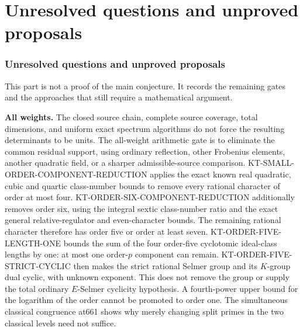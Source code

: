 \documentclass[11pt,a4paper]{article}
\theoremstyle{definition}
\renewcommand{\paragraph}[1]{\par\smallskip\noindent\textbf{#1}\quad\ignorespaces}
\begin{document}

\part{Unresolved questions and unproved proposals}

\section{Unresolved questions and unproved proposals}

This part is not a proof of the main conjecture. It records the
remaining gates and the approaches that still require a
mathematical argument.

\paragraph{All weights.}
The closed source chain, complete source coverage, total
dimensions, and uniform exact spectrum algorithms do not
force the resulting determinants to be units. The all-weight
arithmetic gate is to eliminate the common residual support,
using ordinary reflection, other Frobenius elements, another
quadratic field, or a sharper admissible-source comparison.
KT-SMALL-ORDER-COMPONENT-REDUCTION applies the exact known
real quadratic, cubic and quartic class-number bounds to
remove every rational character of order at most four.
KT-ORDER-SIX-COMPONENT-REDUCTION additionally removes order six,
using the integral sextic class-number ratio and the exact general
relative-regulator and even-character bounds.
The remaining rational character therefore has order five or
order at least seven. KT-ORDER-FIVE-LENGTH-ONE bounds the sum
of the four order-five cyclotomic ideal-class lengths by one:
at most one order-$p$ component can remain.
KT-ORDER-FIVE-STRICT-CYCLIC then makes the strict rational
Selmer group and its $K$-group dual cyclic, with unknown exponent.
This does not remove the group or supply the total ordinary
$E$-Selmer cyclicity hypothesis.
A fourth-power upper bound for the logarithm of the order
cannot be promoted to order one. The simultaneous classical
congruence at661 shows why merely changing split primes in
the two classical levels need not suffice.
\end{document}

